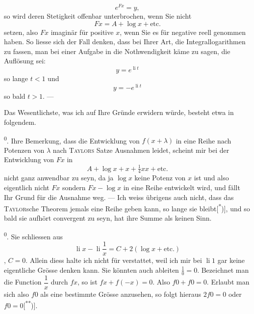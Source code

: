 \[
e^{Fx}=y,
\]
\noindent so wird deren Stetigkeit offenbar unterbrochen, wenn Sie nicht 
\[
Fx=A+\log x+\text{etc.}
\]
\noindent setzen, also $Fx$ imaginär für positive $x$, wenn Sie es für negative reell genommen haben. So liesse sich der Fall denken, dass bei Ihrer Art, die Integrallogarithmen zu fassen, man bei einer Aufgabe in die Nothwendigkeit käme zu sagen, die Auflösung sei:
\clearpage{}
\[
y=e^{\operatorname{li}t}
\]
\noindent so lange $t<1$ und
\[
y=-e^{\operatorname{li}t}
\]
\noindent so bald $t>1$. —

\indent Das Wesentlichste, was ich auf Ihre  Gründe erwidern würde, besteht etwa in folgendem.

\textsuperscript{0}. Ihre Bemerkung, dass die Entwicklung von $f(x+\lambda)$ in eine Reihe nach Potenzen von $\lambda$ nach \textsc{Taylors} Satze Ausnahmen leidet, scheint mir bei der Entwicklung von $Fx$ in
\[
A+\log x+x+\tfrac{1}{4}xx+\text{etc.}
\]
\noindent nicht ganz anwendbar zu seyn, da ja $\log x$ keine Potenz von $x$ ist und also eigentlich nicht $Fx$ sondern $Fx-\log x$ in eine  Reihe entwickelt wird, und  fällt Ihr Grund für die Ausnahme weg. — Ich weiss übrigens auch nicht, dass das \textsc{Taylor}sche Theorem jemals eine  Reihe geben kann, so lange sie  bleibt[\textsuperscript{*})], und so bald sie aufhört convergent zu seyn, hat ihre Summe als  keinen Sinn.

\textsuperscript{0}. Sie schliessen aus
\[
\operatorname{li}x-\operatorname{li}\frac{1}{x}=C+2(\log x+\text{etc.})
\]
\noindent {}, $C=0$. Allein diess halte ich nicht für verstattet, weil ich mir bei $\operatorname{li}1$ gar keine eigentliche Grösse denken kann. Sie könnten  auch ableiten $\tfrac{1}{0}=0$. Bezeichnet man die Function $\dfrac{1}{x}$ durch $fx$, so ist $fx+f(-x)=0$. Also $f0+f0=0$. Erlaubt man sich also $f0$ als eine bestimmte Grösse anzusehen, so folgt hieraus $2f0=0$ oder $f0=0$[\textsuperscript{**})].

